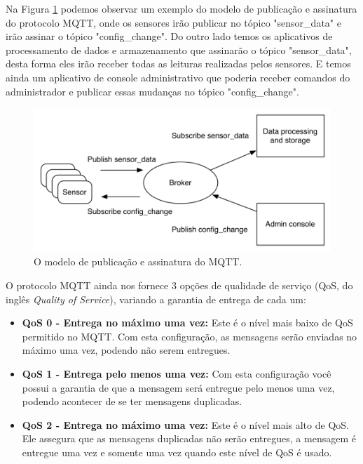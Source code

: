 Na Figura \ref{fig:mqtt} podemos observar um exemplo do modelo de publicação e assinatura do protocolo MQTT, onde os sensores irão publicar no tópico "sensor\_data" e irão assinar o tópico "config\_change". Do outro lado temos os aplicativos de processamento de dados e armazenamento que assinarão o tópico "sensor\_data", desta forma eles irão receber todas as leituras realizadas pelos sensores. E temos ainda um aplicativo de console administrativo que poderia receber comandos do administrador e publicar essas mudanças no tópico "config\_change"\hspace{0.2cm}\cite{yuan2017mqtt}.

\begin{figure}[H]
\centering
\includegraphics[scale=0.95]{04-figuras/mqtt.png}
\caption{O modelo de publicação e assinatura do MQTT.}
\vspace{-\baselineskip}
\label{fig:mqtt}
\end{figure}

O protocolo MQTT ainda nos fornece 3 opções de qualidade de serviço (QoS, do inglês \textit{Quality of Service}), variando a garantia de entrega de cada um:

\begin{itemize}
    \item \textbf{QoS 0 - Entrega no máximo uma vez:} Este é o nível mais baixo de QoS permitido no MQTT. Com esta configuração, as mensagens serão enviadas no máximo uma vez, podendo não serem entregues.
    
    \item \textbf{QoS 1 - Entrega pelo menos uma vez:} Com esta configuração você possui a garantia de que a mensagem será entregue pelo menos uma vez, podendo acontecer de se ter mensagens duplicadas.
    
    \item \textbf{QoS 2 - Entrega no máximo uma vez:} Este é o nível mais alto de QoS. Ele assegura que as mensagens duplicadas não serão entregues, a mensagem é entregue uma vez e somente uma vez quando este nível de QoS é usado.
\end{itemize}


